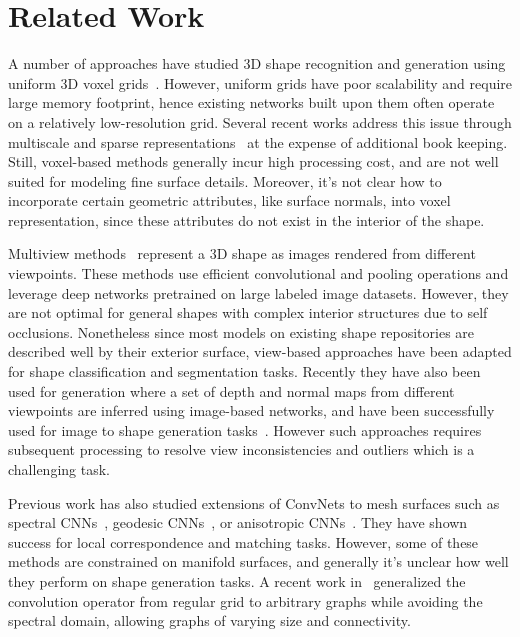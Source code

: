 \section{Related Work}
A number of approaches have studied 3D shape recognition and generation using uniform 3D voxel grids~\cite{choy20163d,wu20153d,Huang:PCL,voxnet,BrockLRW16,3dgan}.
However, uniform grids have poor scalability and require large memory footprint, hence existing networks built upon them often operate on a relatively low-resolution grid. 
Several recent works address this issue through multiscale and sparse representations~\cite{Riegler2017CVPR,tatarchenko2017octree,ocnn,hie3dcnn,splatnet,graham17sparse} at the expense of additional book keeping. 
Still, voxel-based methods generally incur high processing cost, and are not well suited for modeling fine surface details. 
Moreover, it's not clear how to incorporate certain geometric attributes, like surface normals, into voxel representation, since these attributes do not exist in the interior of the shape.




Multiview methods~\cite{mvcnn,qi2016volumetric,Soltani17,LunGKMW17,kalogerakis20173d} represent a 3D shape as images rendered from different viewpoints. 
These methods use efficient convolutional and pooling operations and leverage deep networks pretrained on large labeled image datasets.
However, they are not optimal for general shapes with complex interior structures due to self occlusions.
Nonetheless since most models on existing shape repositories are described well by their exterior surface, view-based approaches have been adapted
for shape classification and segmentation tasks. 
Recently they have also been used for generation where a set of depth and normal maps from different viewpoints are inferred using image-based networks, and have been successfully used for image to shape generation tasks~\cite{LunGKMW17,lin2018learning}.
However such approaches requires subsequent processing to resolve view inconsistencies and outliers which is a challenging task.

Previous work has also studied extensions of ConvNets to mesh surfaces such as spectral CNNs~\cite{bruna:spectral,Yi:SyncSpec:2017}, geodesic CNNs~\cite{masci:gcnn}, or anisotropic CNNs~\cite{Boscaini2016LearningSC}. They have shown success for local correspondence and matching tasks. However, some of these methods are constrained on manifold surfaces, and generally it's unclear how well they perform on shape generation tasks.
A recent work in~\cite{SimonovskyK17} generalized the convolution operator from regular grid to arbitrary graphs while avoiding the spectral domain, allowing graphs of varying size and connectivity. 

